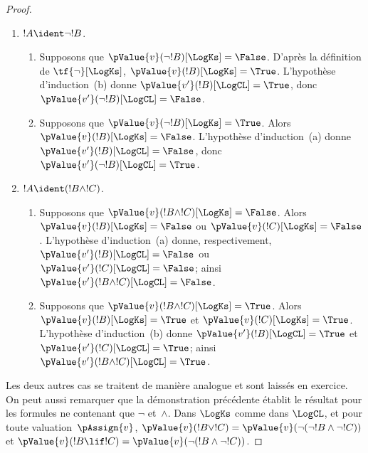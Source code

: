 \documentclass[../../../include/open-logic-section]{subfiles}
\begin{document}
\begin{proof}
\begin{enumerate}
    Pour l'hérédité, examinons les cas
    suivants.
    \item $!A\ident\lnot !B$.
    \begin{enumerate}
      \item Supposons que
      $\pValue{v}(\lnot !B)[\LogKs]
      =\False$. D'après la définition
      de $\tf{\lnot}[\LogKs]$,
      $\pValue{v}(!B)[\LogKs]=\True$.
      L'hypothèse d'induction~(b)
      donne
      $\pValue{v'}(!B)[\LogCL]=\True$,
      donc
      $\pValue{v'}(\lnot !B)[\LogCL]
      =\False$.
      \item Supposons que
      $\pValue{v}(\lnot !B)[\LogKs]
      =\True$. Alors
      $\pValue{v}(!B)[\LogKs]=\False$.
      L'hypothèse d'induction~(a)
      donne
      $\pValue{v'}(!B)[\LogCL]=\False$,
      donc
      $\pValue{v'}(\lnot !B)[\LogCL]
      =\True$.
    \end{enumerate}

    \item $!A\ident(!B\land !C)$.
    \begin{enumerate}
      \item Supposons que
      $\pValue{v}(!B\land !C)[\LogKs]
      =\False$. Alors
      $\pValue{v}(!B)[\LogKs]=\False$
      ou
      $\pValue{v}(!C)[\LogKs]=\False$.
      L'hypothèse d'induction~(a)
      donne, respectivement,
      $\pValue{v'}(!B)[\LogCL]=\False$
      ou
      $\pValue{v'}(!C)[\LogCL]=\False$;
      ainsi
      $\pValue{v'}(!B\land !C)[\LogCL]
      =\False$.
      \item Supposons que
      $\pValue{v}(!B\land !C)[\LogKs]
      =\True$. Alors
      $\pValue{v}(!B)[\LogKs]=\True$
      et
      $\pValue{v}(!C)[\LogKs]=\True$.
      L'hypothèse d'induction~(b)
      donne
      $\pValue{v'}(!B)[\LogCL]=\True$
      et
      $\pValue{v'}(!C)[\LogCL]=\True$;
      ainsi
      $\pValue{v'}(!B\land !C)[\LogCL]
      =\True$.
    \end{enumerate}
  \end{enumerate}

  Les deux autres cas se traitent de
  manière analogue et sont laissés
  en exercice. On peut aussi remarquer
  que la démonstration précédente
  établit le résultat pour les formules
  ne contenant que $\lnot$ et~$\land$.
  Dans $\LogKs$ comme dans $\LogCL$,
  et pour toute valuation~$\pAssign{v}$,
  $\pValue{v}(!B\lor !C)
  =\pValue{v}(\lnot(\lnot !B\land
  \lnot !C))$ et
  $\pValue{v}(!B\lif !C)
  =\pValue{v}(\lnot(!B\land
  \lnot !C))$.
\end{proof}
\end{document}
